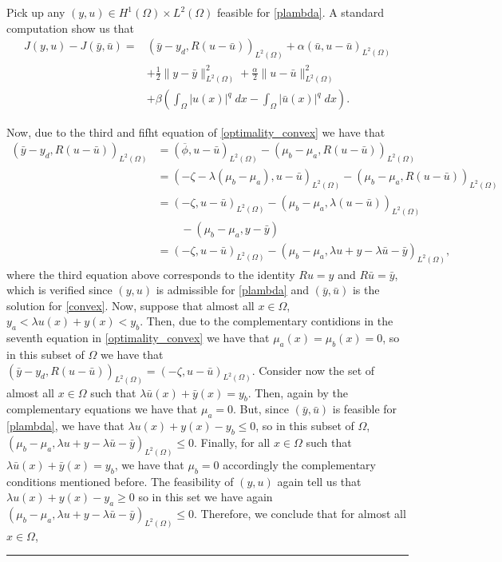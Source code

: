 \documentclass[11pt,a4paper]{amsart}
\newcommand{\kw}{\rule{2mm}{2mm}}
\newcommand{\om}{\Omega}
\renewenvironment{proof}{{Proof.}}{\hfill\kw}
\newcommand{\norm}[1]{\lVert #1 \rVert}
\begin{document}
\begin{proof}
    Pick up any $(y,u)\in H^{1}(\om)\times L^2(\om)$ feasible for \eqref{plambda}. A standard computation show us that
     \begin{equation}\label{eq1:theorem2}
     \begin{split}
        J(y,u)-J(\bar{y},\bar{u})=&(\bar{y}-y_d, R(u-\bar{u}))_{L^2(\Omega)}+\alpha(\bar{u},u-\bar{u})_{L^2(\Omega)}\\
        &+\frac{1}{2}\norm{y-\bar{y}}_{L^2(\om)}^2+\frac{\alpha}{2}\norm{u-\bar{u}}_{L^2(\om)}^2\\
        &+\beta\left(\int_{\Omega}|u(x)|^q\; dx-\int_{\om}|\bar{u}(x)|^q\; dx\right).
        \end{split}
    \end{equation}

    Now, due to the third and fifht equation of \eqref{optimality_convex} we have that
    \begin{align*}
        (\bar{y}-y_d, R(u-\bar{u}))_{L^2(\Omega)}&=(\overline{\phi}, u-\bar{u})_{L^2(\Omega)}-(\mu_b-\mu_a,R(u-\bar{u}))_{L^2(\Omega)}\\
        &=(-\zeta-\lambda(\mu_b-\mu_a),u-\bar{u})_{L^2(\om)}-(\mu_b-\mu_a,R(u-\bar{u}))_{L^2(\Omega)}\\
        &=(-\zeta,u-\bar{u})_{L^2(\om)}-(\mu_b-\mu_a,\lambda(u-\bar{u}))_{L^2(\om)}\\
        &\phantom{=-}-(\mu_b-\mu_a,y-\bar{y})\\
        &=(-\zeta,u-\bar{u})_{L^2(\om)}-(\mu_b-\mu_a,\lambda u+y-\lambda \bar{u}-\bar{y})_{L^2(\om)},
    \end{align*}
  where the third equation above corresponds to the identity $Ru=y$ and $R\bar{u}=\bar{y}$, which is verified since $(y,u)$ is admissible for \eqref{plambda} and $(\bar{y},\bar{u})$ is the solution for \eqref{convex}. Now, suppose that almost all $x\in \om$, $y_a<\lambda u(x)+y(x)<y_b$. Then, due to the complementary contidions in the seventh equation in \eqref{optimality_convex} we have that $\mu_a(x)=\mu_b(x)=0$, so in this subset of $\om$ we have that $(\bar{y}-y_d, R(u-\bar{u}))_{L^2(\Omega)}=(-\zeta,u-\bar{u})_{L^2(\om)}$. Consider now the set of almost all $x\in \om$ such that $\lambda \bar{u}(x)+\bar{y}(x)=y_b$. Then, again by the complementary equations we have that $\mu_a=0$. But, since $(\bar{y},\bar{u})$ is feasible for \eqref{plambda}, we have that $\lambda u(x)+y(x)-y_b\le 0$, so in this subset of $\om$, $(\mu_b-\mu_a,\lambda u+y-\lambda \bar{u}-\bar{y})_{L^2(\om)}\le 0$. Finally, for all $x\in \om$ such that $\lambda \bar{u}(x)+\bar{y}(x)=y_b$, we have that $\mu_b=0$ accordingly the complementary conditions mentioned before. The feasibility of $(y,u)$ again tell us that $\lambda u(x)+y(x)-y_a\ge 0$ so in this set we have again $(\mu_b-\mu_a,\lambda u+y-\lambda \bar{u}-\bar{y})_{L^2(\om)}\le 0$. Therefore, we conclude that for almost all $x\in \om$,

\end{proof}
\end{document}
